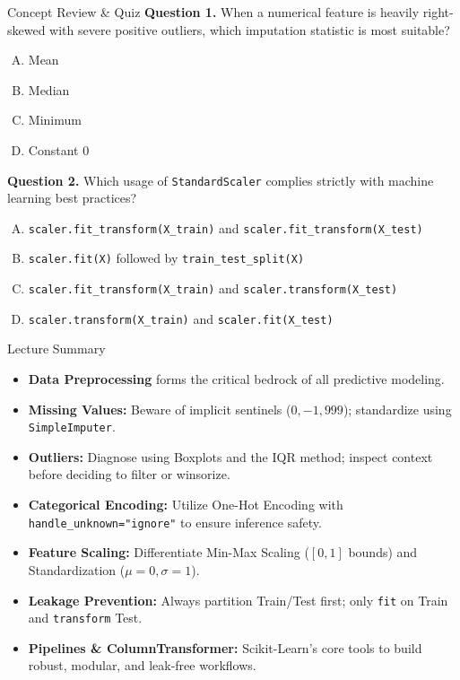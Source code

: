 \documentclass[aspectratio=169,11pt]{beamer}
\newcommand{\code}[1]{\texttt{#1}}
\newcommand{\smallgap}{\vspace{0.35em}}
\begin{document}
\begin{frame}{Concept Review \& Quiz}
\textbf{Question 1.} When a numerical feature is heavily right-skewed with severe positive outliers, which imputation statistic is most suitable?
\begin{enumerate}[A.]
  \item Mean
  \item Median
  \item Minimum
  \item Constant 0
\end{enumerate}

\smallgap
\textbf{Question 2.} Which usage of \code{StandardScaler} complies strictly with machine learning best practices?
\begin{enumerate}[A.]
  \item \code{scaler.fit\_transform(X\_train)} and \code{scaler.fit\_transform(X\_test)}
  \item \code{scaler.fit(X)} followed by \code{train\_test\_split(X)}
  \item \code{scaler.fit\_transform(X\_train)} and \code{scaler.transform(X\_test)}
  \item \code{scaler.transform(X\_train)} and \code{scaler.fit(X\_test)}
\end{enumerate}
\end{frame}

\begin{frame}{Lecture Summary}
\begin{itemize}
  \item \textbf{Data Preprocessing} forms the critical bedrock of all predictive modeling.
  \item \textbf{Missing Values:} Beware of implicit sentinels ($0, -1, 999$); standardize using \code{SimpleImputer}.
  \item \textbf{Outliers:} Diagnose using Boxplots and the IQR method; inspect context before deciding to filter or winsorize.
  \item \textbf{Categorical Encoding:} Utilize One-Hot Encoding with \code{handle\_unknown="ignore"} to ensure inference safety.
  \item \textbf{Feature Scaling:} Differentiate Min-Max Scaling ($[0,1]$ bounds) and Standardization ($\mu=0, \sigma=1$).
  \item \textbf{Leakage Prevention:} Always partition Train/Test first; only \code{fit} on Train and \code{transform} Test.
  \item \textbf{Pipelines \& ColumnTransformer:} Scikit-Learn's core tools to build robust, modular, and leak-free workflows.
\end{itemize}
\end{frame}
\end{document}
